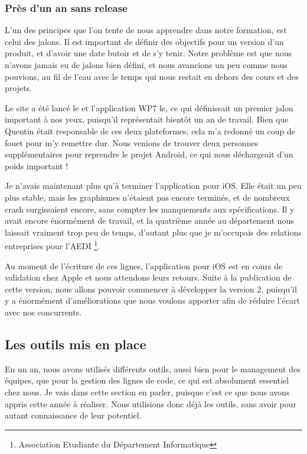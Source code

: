 \documentclass{article}
\begin{document}
\subsubsection{Près d'un an sans release}
		L'un des principes que l'on tente de nous apprendre dans notre formation, est celui des jalons. Il est important de définir des objectifs pour un version d'un produit, et d'avoir une date butoir et de s'y tenir. Notre problème est que nous n'avons jamais eu de jalons bien défini, et nous avancions un peu comme nous pouvions, au fil de l'eau avec le temps qui nous restait en dehors des cours et des projets.  
		
		Le site a été lancé le et l'application WP7 le, ce qui définissait un premier jalon important à nos yeux, puisqu'il représentait bientôt un an de travail. Bien que Quentin était responsable de ces deux plateformes, cela m'a redonné un coup de fouet pour m'y remettre dur. Nous venions de trouver deux personnes supplémentaires pour reprendre le projet Android, ce qui nous déchargeait d'un poids important !
		
		Je n'avais maintenant plus qu'à terminer l'application pour iOS. Elle était un peu plus stable, mais les graphismes n'étaient pas encore terminés, et de nombreux crash surgissaient encore, sans compter les manquements aux spécifications. Il y avait encore énormément de travail, et la quatrième année au département nous laissait vraiment trop peu de temps, d'autant plus que je m'occupais des relations entreprises pour l'AEDI \footnote{Association Etudiante du Département Informatique}. 
		
		Au moment de l'écriture de ces lignes, l'application pour iOS est en cours de validation chez Apple et nous attendons leurs retours. Suite à la publication de cette version, nous allons pouvoir commencer à développer la version 2, puisqu'il y a énormément d'améliorations que nous voulons apporter afin de réduire l'écart avec nos concurrents. 
		
\subsection{Les outils mis en place}
		En un an, nous avons utilisés différents outils, aussi bien pour le management des équipes, que pour la gestion des lignes de code, ce qui est absolument essentiel chez nous. Je vais dans cette section en parler, puisque c'est ce que nous avons appris cette année à réaliser. Nous utilisions donc déjà les outils, sans avoir pour autant connaissance de leur potentiel.
\end{document}
